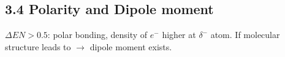 \subsection{3.4 Polarity and Dipole moment} 
\begin{minipage}{20mm}
\end{minipage}
\begin{minipage}{47mm}
    $\Delta EN>0.5$: polar bonding, density of $e^-$ higher at $\delta^-$ atom.
        If molecular structure leads to  $\rightarrow$ dipole moment exists.\\
\end{minipage}    
\vspace*{0.0em}
